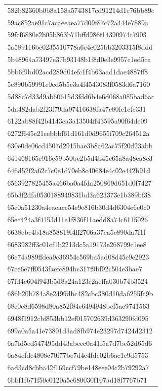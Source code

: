 \begin{tabular}{l}
582b82360b0b8a158a5743817cd91214d1c76bb89c \\
59ac852ae91c7acaeeaea77d09f87c72a444e7889a \\
59fcf6880e2b05b863b71bffd986f14390974c7903 \\
5a589116be0235510778a6c4c025bb3203315f8ddd \\
5b48964a73497e37b93148b1f8d0e3e9957c1ed5ca \\
5bb6f9bd02acd289d04efc1f4b63aad1dae4887ff8 \\
5c890b59991e0ed5b5e3a4f4543083f0583d6a7160 \\
5d88c7d33d9ab60615d3fdd6b4e6d068a085bad6ac \\
5da482dab2f23f79da97416638fa47c80fe1efc331 \\
6122ab88f42b4143ea3a13504ff43595a90f64de09 \\
6272f645e21eebbbf61d161d0d9655f709c264512a \\
630e0de06cd4507d2915bae3b8a62ac75f20d23abb \\
641468165e916e59b50be2b5d4b45c65a8a48ea8c3 \\
646d52f2a62c7c0e1d70eb8c40684e4c02e442b91d \\
6563927825455a466ba0a4fda250869d651d0f7427 \\
65b3f2dfa0530188949831bd3a623373e1b389bf38 \\
65e0a51230a4eaeace54e9e816b30d4d6304e6e0c0 \\
65ec424a3f4153d11e1f836f11aedd8a74c6115026 \\
6638cbe4b18a858819f4ff2706a37ea5c890da7f1f \\
6683982ff3c01cf1b2213dc5a19173e268799c1ee8 \\
66c74a989ffdea9c36954c569ba5ad08d45e9c2923 \\
67ce6e7ff0543faefc894bc317f9bf92c504e3bae7 \\
67fd4e604f943b5d8a24a123c2aeffa030b74b3524 \\
686b20b784a8e2499dbc482cbc380d10da6255fc9b \\
68c0c8d6598d80a852f84c6494948bcf5ac9741563 \\
6948f1912cbf853bb12ef015702639d363290fd095 \\
699a0a5a41e73801d3ad8fb974e23297d7424d2312 \\
6a7fd5ed547495dd43abeec0a41f5a7d7bc52d65d6 \\
6a84efdc4808c70f77bc7d4e4fdc02b6ac1e9d5753 \\
6ad3cd8cbba42f169ccf79be148eee04c2b79292a7 \\
6bbf1fb71f50c0120a5c680030f107ad18f7767b71 \\

\end{tabular}
